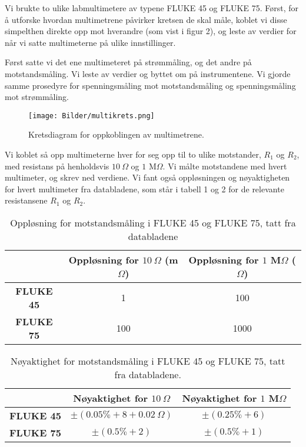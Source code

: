 \documentclass[norsk,a4paper,12pt]{article}
\begin{document}
Vi brukte to ulike labmultimetere av typene FLUKE 45 og FLUKE 75. Først, for å utforske hvordan multimetrene påvirker kretsen de skal måle, koblet vi disse simpelthen direkte opp mot hverandre (som vist i figur 2), og leste av verdier for når vi satte multimeterne på ulike innstillinger. 

Først satte vi det ene multimeteret på strømmåling, og det andre på motstandsmåling. Vi leste av verdier og byttet om på instrumentene. Vi gjorde samme prosedyre for spenningsmåling mot motstandsmåling og spenningsmåling mot strømmåling. 

\begin{figure}
\begin{center}
  \texttt{[image: Bilder/multikrets.png]}\\
  \caption{Kretsdiagram for oppkoblingen av multimetrene. }\label{fig:krets}
  \end{center}
\end{figure}

Vi koblet så opp multimeterne hver for seg opp til to ulike motstander, $R_1$ og $R_2$, med resistans på henholdsvis $10 \ \Omega$ og $1$ M$\Omega$. Vi målte motstandene med hvert multimeter, og skrev ned verdiene. Vi fant også oppløsningen og nøyaktigheten for hvert multimeter fra databladene, som står i tabell 1 og 2 for de relevante resistansene $R_1$ og $R_2$. 

\begin{table}
  \begin{center}
  \caption{Oppløsning for motstandsmåling i FLUKE 45 og FLUKE 75, tatt fra databladene}
  \begin{tabular}{|c|c|c|} \hline
  \textbf{} & \textbf{Oppløsning for $10 \ \Omega$ (m$\Omega$)} & \textbf{Oppløsning for $1$ M$\Omega$ ($\Omega$)} \\ \hline
  \textbf{FLUKE 45} & 1  & 100 \\ \hline
  \textbf{FLUKE 75} & 100 & 1000 \\ \hline
  \end{tabular}
  \end{center}
  \label{tab:oppløsning}
\end{table}

\begin{table}
  \begin{center}
  \caption{Nøyaktighet for motstandsmåling i FLUKE 45 og FLUKE 75, tatt fra databladene.}
  \begin{tabular}{|c|c|c|} \hline
  \textbf{} & \textbf{Nøyaktighet for $10 \ \Omega$} & \textbf{Nøyaktighet for $1$ M$\Omega$} \\ \hline
  \textbf{FLUKE 45} & $\pm (0.05\% + 8 + 0.02 \ \Omega)$  & $\pm (0.25\% + 6)$ \\ \hline
  \textbf{FLUKE 75} & $\pm (0.5\% + 2)$ & $\pm (0.5\% + 1)$ \\ \hline
  \end{tabular}
  \end{center}
  \label{tab:nøyaktighet}
\end{table}
\end{document}

